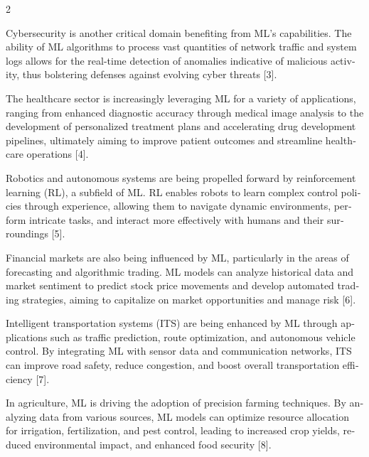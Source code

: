 \documentclass[twoside]{article}
\begin{document}
\begin{multicols}{2}
\begin{otherlanguage}{english}
Cybersecurity is another critical domain benefiting from ML's capabilities. The ability of ML algorithms to process vast quantities of network traffic and system logs allows for the real-time detection of anomalies indicative of malicious activity, thus bolstering defenses against evolving cyber threats [3].

The healthcare sector is increasingly leveraging ML for a variety of applications, ranging from enhanced diagnostic accuracy through medical image analysis to the development of personalized treatment plans and accelerating drug development pipelines, ultimately aiming to improve patient outcomes and streamline healthcare operations [4].

Robotics and autonomous systems are being propelled forward by reinforcement learning (RL), a subfield of ML. RL enables robots to learn complex control policies through experience, allowing them to navigate dynamic environments, perform intricate tasks, and interact more effectively with humans and their surroundings [5].

Financial markets are also being influenced by ML, particularly in the areas of forecasting and algorithmic trading. ML models can analyze historical data and market sentiment to predict stock price movements and develop automated trading strategies, aiming to capitalize on market opportunities and manage risk [6].

Intelligent transportation systems (ITS) are being enhanced by ML through applications such as traffic prediction, route optimization, and autonomous vehicle control. By integrating ML with sensor data and communication networks, ITS can improve road safety, reduce congestion, and boost overall transportation efficiency [7].

In agriculture, ML is driving the adoption of precision farming techniques. By analyzing data from various sources, ML models can optimize resource allocation for irrigation, fertilization, and pest control, leading to increased crop yields, reduced environmental impact, and enhanced food security [8].
\end{otherlanguage}

\vspace{6pt}

\par\vspace{4pt}


\end{multicols}
\end{document}
